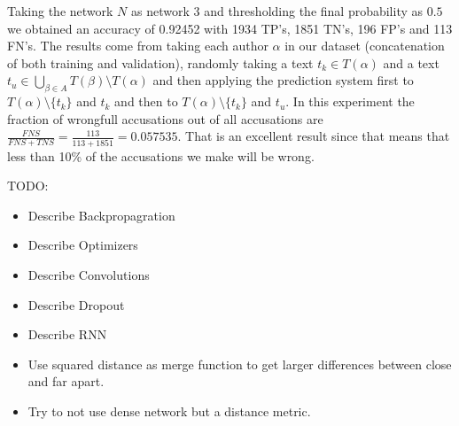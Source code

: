 Taking the network $N$ as network 3 and thresholding the final probability as
$0.5$ we obtained an accuracy of 0.92452 with 1934 \gls{TP}'s, 1851 \gls{TN}'s,
196 \gls{FP}'s and 113 \gls{FN}'s. The results come from taking each author
$\alpha$ in our dataset (concatenation of both training and validation),
randomly taking a text $t_k \in T(\alpha)$ and a text
$t_u \in \bigcup_{\beta \in A} T(\beta) \setminus T(\alpha)$ and then applying
the prediction system first to $T(\alpha) \setminus \{t_k\}$ and $t_k$ and then
to $T(\alpha) \setminus \{t_k\}$ and $t_u$. In this experiment the fraction of
wrongfull accusations out of all accusations are $\frac{FNS}{FNS + TNS} =
\frac{113}{113 + 1851} = 0.057535$. That is an excellent result since that means
that less than 10\% of the accusations we make will be wrong.

TODO:
\begin{itemize}
    \item Describe Backpropagration
    \item Describe Optimizers
    \item Describe Convolutions
    \item Describe Dropout
    \item Describe RNN
    \item Use squared distance as merge function to get larger differences
        between close and far apart.
    \item Try to not use dense network but a distance metric.
\end{itemize}

